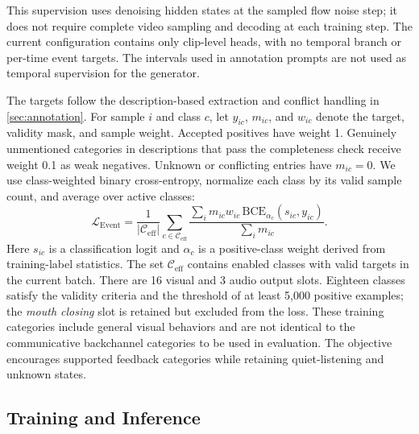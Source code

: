 This supervision uses denoising hidden states at the sampled flow noise step; it does not require complete video sampling and decoding at each training step. The current configuration contains only clip-level heads, with no temporal branch or per-time event targets. The intervals used in annotation prompts are not used as temporal supervision for the generator.

The targets follow the description-based extraction and conflict handling in \cref{sec:annotation}. For sample $i$ and class $c$, let $y_{ic}$, $m_{ic}$, and $w_{ic}$ denote the target, validity mask, and sample weight. Accepted positives have weight 1. Genuinely unmentioned categories in descriptions that pass the completeness check receive weight 0.1 as weak negatives. Unknown or conflicting entries have $m_{ic}=0$. We use class-weighted binary cross-entropy, normalize each class by its valid sample count, and average over active classes:
\begin{equation}
\mathcal L_{\mathrm{Event}} =
\frac{1}{|\mathcal C_{\mathrm{eff}}|}
\sum_{c\in\mathcal C_{\mathrm{eff}}}
\frac{\sum_i m_{ic} w_{ic}\,\mathrm{BCE}_{\alpha_c}(s_{ic},y_{ic})}
{\sum_i m_{ic}}.
\label{eq:event}
\end{equation}
Here $s_{ic}$ is a classification logit and $\alpha_c$ is a positive-class weight derived from training-label statistics. The set $\mathcal C_{\mathrm{eff}}$ contains enabled classes with valid targets in the current batch. There are 16 visual and 3 audio output slots. Eighteen classes satisfy the validity criteria and the threshold of at least 5,000 positive examples; the \emph{mouth closing} slot is retained but excluded from the loss. These training categories include general visual behaviors and are not identical to the communicative backchannel categories to be used in evaluation. The objective encourages supported feedback categories while retaining quiet-listening and unknown states.

\subsection{Training and Inference}
\label{sec:training}

